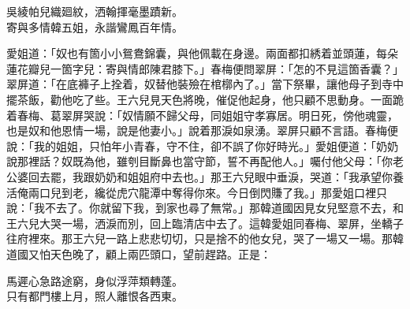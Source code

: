 \begin{myquote}
吳綾帕兒織廻紋，洒翰揮毫墨蹟新。\\寄與多情韓五姐，永諧鸞鳳百年情。{}
\end{myquote}

愛姐道：「奴也有箇小小鴛鴦錦囊，與他佩載在身邊。兩面都扣綉着並頭蓮，每朵蓮花瓣兒一箇字兒：寄與情郎陳君膝下。」春梅便問翠屏：「怎的不見這箇香囊？」翠屏道：「在底褲子上拴着，奴替他裝殮在棺槨內了。」當下祭畢，讓他母子到寺中擺茶飯，勸他吃了些。王六兒見天色將晚，催促他起身，他只顧不思動身。一面跪着春梅、葛翠屏哭說：「奴情願不歸父母，同姐姐守孝寡居。明日死，傍他魂靈，也是奴和他恩情一場，說是他妻小。」說着那淚如泉湧。{}翠屏只顧不言語。春梅便說：「我的姐姐，只怕年小青春，守不住，卻不誤了你好時光。」愛姐便道：「奶奶說那裡話？奴既為他，雖刳目斷鼻也當守節，誓不再配他人。」囑付他父母：「你老公婆回去罷，我跟奶奶和姐姐府中去也。」那王六兒眼中垂淚，哭道：「我承望你養活俺兩口兒到老，纔從虎穴龍潭中奪得你來。今日倒閃賺了我。」那愛姐口裡只說：「我不去了。你就留下我，到家也尋了無常。」{}那韓道國因見女兒堅意不去，和王六兒大哭一場，洒淚而別，回上臨清店中去了。這韓愛姐同春梅、翠屏，坐轎子往府裡來。那王六兒一路上悲悲切切，只是捨不的他女兒，哭了一場又一場。{}那韓道國又怕天色晚了，顧上兩匹頭口，望前趕路。正是：

\begin{myquote}
馬遲心急路途窮，身似浮萍類轉蓬。\\只有都門樓上月，照人離恨各西東。
\end{myquote}

